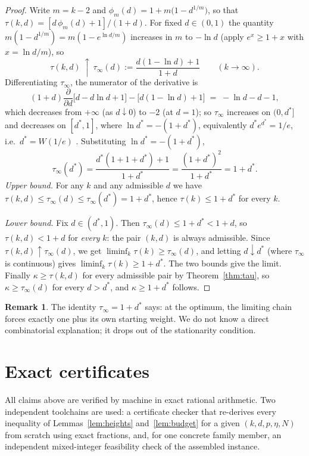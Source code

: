 \documentclass[11pt]{article}
\theoremstyle{definition}
\newtheorem{remark}[theorem]{Remark}
\newcommand{\W}{W}
\begin{document}
\begin{proof}
Write $m=k-2$ and $\phi_m(d)=1+m\bigl(1-d^{1/m}\bigr)$, so that
$\tau(k,d)=[d\,\phi_m(d)+1]/(1+d)$.  For fixed $d\in(0,1)$ the quantity
$m(1-d^{1/m})=m(1-e^{\ln d/m})$ increases in $m$ to $-\ln d$ (apply
$e^x\ge1+x$ with $x=\ln d/m$), so
\[
 \tau(k,d)\ \uparrow\ \tau_\infty(d):=\frac{d(1-\ln d)+1}{1+d}
 \qquad(k\to\infty).
\]
Differentiating $\tau_\infty$, the numerator of the derivative is
\[
 (1+d)\frac{\partial}{\partial d}\bigl[d-d\ln d+1\bigr]
 -\bigl[d(1-\ln d)+1\bigr]
 \;=\;-\ln d-d-1,
\]
which decreases from $+\infty$ (as $d\downarrow0$) to $-2$ (at $d=1$); so
$\tau_\infty$ increases on $(0,d^*]$ and decreases on $[d^*,1]$, where
$\ln d^*=-(1+d^*)$, equivalently $d^*e^{d^*}=1/e$, i.e.\ $d^*=\W(1/e)$
\citep{CorlessGonnetHareJeffreyKnuth1996}.  Substituting
$\ln d^*=-(1+d^*)$,
\[
 \tau_\infty(d^*)=\frac{d^*(1+1+d^*)+1}{1+d^*}
 =\frac{(1+d^*)^2}{1+d^*}=1+d^*.
\]
\emph{Upper bound.}  For any $k$ and any admissible $d$ we have
$\tau(k,d)\le\tau_\infty(d)\le\tau_\infty(d^*)=1+d^*$, hence
$\tau(k)\le1+d^*$ for every $k$.

\emph{Lower bound.}  Fix $d\in(d^*,1)$.  Then
$\tau_\infty(d)\le1+d^*<1+d$, so $\tau(k,d)<1+d$ for \emph{every} $k$:
the pair $(k,d)$ is always admissible.  Since
$\tau(k,d)\uparrow\tau_\infty(d)$, we get
$\liminf_k\tau(k)\ge\tau_\infty(d)$, and letting $d\downarrow d^*$ (where
$\tau_\infty$ is continuous) gives $\liminf_k\tau(k)\ge1+d^*$.  The two
bounds give the limit.  Finally $\kappa\ge\tau(k,d)$ for every admissible
pair by Theorem~\ref{thm:tau}, so $\kappa\ge\tau_\infty(d)$ for every
$d>d^*$, and $\kappa\ge1+d^*$ follows.
\end{proof}

\begin{remark}
The identity $\tau_\infty=1+d^*$ says: at the optimum, the limiting chain
forces exactly one plus its own starting weight.  We do not know a direct
combinatorial explanation; it drops out of the stationarity condition.
\end{remark}

\section{Exact certificates}\label{sec:certificates}

All claims above are verified by machine in exact rational arithmetic.
Two independent toolchains are used: a certificate checker that
re-derives every inequality of Lemmas~\ref{lem:heights}
and~\ref{lem:budget} for a given $(k,d,p,\eta,N)$ from scratch using
exact fractions, and, for one concrete family member, an independent
mixed-integer feasibility check of the assembled instance.
\end{document}
